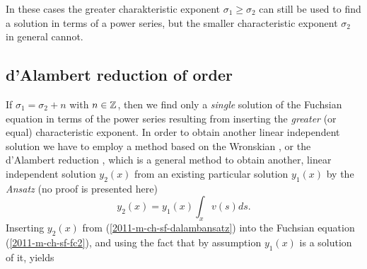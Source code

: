 In these cases the greater charakteristic exponent  $\sigma_1 \ge \sigma_2$
can still be used to find a solution in terms of a power series,
but the smaller characteristic exponent $\sigma_2$ in general cannot.

\subsection{d'Alambert reduction of order}



If $\sigma_1=\sigma_2+n$ with $n\in {\Bbb Z}$,
then we find only a {\em single} solution of the Fuchsian equation in terms of the power series resulting
from inserting the {\em greater} (or equal) characteristic exponent.
In order to obtain another linear  independent solution we have to employ
a method based on the Wronskian \cite{arfken05}, or
the
d'Alambert reduction \cite[15mm]{Teschl-odr},
which is a general method to obtain another, linear independent solution
$y_2(x)$ from an existing particular solution  $y_1(x)$ by the {\it Ansatz}
(no proof is presented here)
\begin{equation}
y_2(x)=y_1(x)\int_x  v(s) ds.
\label{2011-m-ch-sf-dalambansatz}
\end{equation}
Inserting $y_2(x)$ from (\ref{2011-m-ch-sf-dalambansatz}) into the Fuchsian equation (\ref{2011-m-ch-sf-fc2}),
and using the fact that by assumption $y_1(x)$
is a solution of it,
yields
